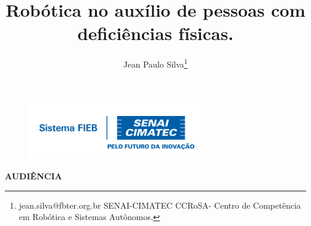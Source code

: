 \documentclass[12pt,a4paper]{article}
\begin{document}
 
\begin{figure}
    \flushright
    \includegraphics[scale=0.5]{Logo_senai.png}
\end{figure}

\title{Robótica no auxílio de pessoas com deficiências físicas.}
\author{Jean Paulo Silva\thanks{jean.silva@fbter.org.br SENAI-CIMATEC  CCRoSA- Centro de Competência em Robótica e Sistemas Autônomos.}}
 
 

    \maketitle
    \singlespacing


    \textbf{AUDIÊNCIA}
\end{document}
